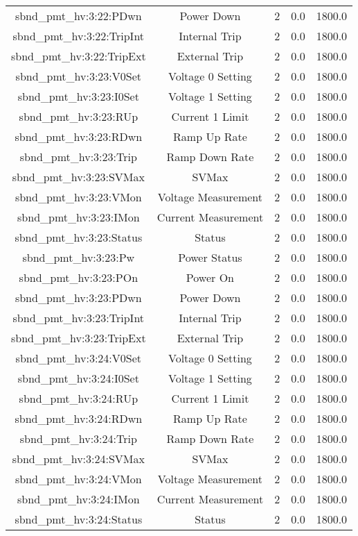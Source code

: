 \begin{table}[ptb]
\begin{tabular}{c | c c c c}
sbnd_pmt_hv:3:22:PDwn & Power Down & 2 & 0.0 & 1800.0\\ 
sbnd_pmt_hv:3:22:TripInt & Internal Trip & 2 & 0.0 & 1800.0\\ 
sbnd_pmt_hv:3:22:TripExt & External Trip & 2 & 0.0 & 1800.0\\ 
sbnd_pmt_hv:3:23:V0Set & Voltage 0 Setting & 2 & 0.0 & 1800.0\\ 
sbnd_pmt_hv:3:23:I0Set & Voltage 1 Setting & 2 & 0.0 & 1800.0\\ 
sbnd_pmt_hv:3:23:RUp & Current 1 Limit & 2 & 0.0 & 1800.0\\ 
sbnd_pmt_hv:3:23:RDwn & Ramp Up Rate & 2 & 0.0 & 1800.0\\ 
sbnd_pmt_hv:3:23:Trip & Ramp Down Rate & 2 & 0.0 & 1800.0\\ 
sbnd_pmt_hv:3:23:SVMax & SVMax & 2 & 0.0 & 1800.0\\ 
sbnd_pmt_hv:3:23:VMon & Voltage Measurement & 2 & 0.0 & 1800.0\\ 
sbnd_pmt_hv:3:23:IMon & Current Measurement & 2 & 0.0 & 1800.0\\ 
sbnd_pmt_hv:3:23:Status & Status & 2 & 0.0 & 1800.0\\ 
sbnd_pmt_hv:3:23:Pw & Power Status & 2 & 0.0 & 1800.0\\ 
sbnd_pmt_hv:3:23:POn & Power On & 2 & 0.0 & 1800.0\\ 
sbnd_pmt_hv:3:23:PDwn & Power Down & 2 & 0.0 & 1800.0\\ 
sbnd_pmt_hv:3:23:TripInt & Internal Trip & 2 & 0.0 & 1800.0\\ 
sbnd_pmt_hv:3:23:TripExt & External Trip & 2 & 0.0 & 1800.0\\ 
sbnd_pmt_hv:3:24:V0Set & Voltage 0 Setting & 2 & 0.0 & 1800.0\\ 
sbnd_pmt_hv:3:24:I0Set & Voltage 1 Setting & 2 & 0.0 & 1800.0\\ 
sbnd_pmt_hv:3:24:RUp & Current 1 Limit & 2 & 0.0 & 1800.0\\ 
sbnd_pmt_hv:3:24:RDwn & Ramp Up Rate & 2 & 0.0 & 1800.0\\ 
sbnd_pmt_hv:3:24:Trip & Ramp Down Rate & 2 & 0.0 & 1800.0\\ 
sbnd_pmt_hv:3:24:SVMax & SVMax & 2 & 0.0 & 1800.0\\ 
sbnd_pmt_hv:3:24:VMon & Voltage Measurement & 2 & 0.0 & 1800.0\\ 
sbnd_pmt_hv:3:24:IMon & Current Measurement & 2 & 0.0 & 1800.0\\ 
sbnd_pmt_hv:3:24:Status & Status & 2 & 0.0 & 1800.0\\ 

\end{tabular}
\end{table}
